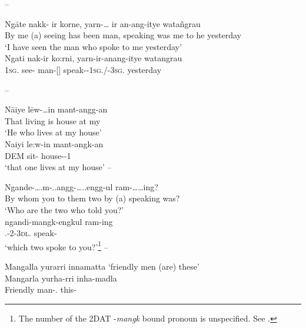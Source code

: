 \documentclass{langscibook}
\begin{document}
\begin{xlist}
\begin{xlist}
\end{xlist}
\z
--
\ea\label{ex:key:44} %
\begin{xlist}
	\ex
	\gll Ngāte {} nakk- ir korne, yarn-… ir an-ang-itye watañgrau \\
	{By me} (a) seeing {has been} man, speaking was {me to he} yesterday \\
	\glt `I have seen the man who spoke to me yesterday' \\
	\citep[33]{meyer_vocabulary_1843}
	\ex
	\gll Ngati nak-ir ko:rni, yarn-ir-anang-itye watangrau \\
	1\textsc{sg}. see- man-[]   speak--1\textsc{sg}./-3\textsc{sg}.       yesterday \\
\end{xlist}
\z
--
\ea\label{ex:key:45}
\begin{xlist}
	\ex
	\gll Nāiye lēw-…in mant-angg-an \\
	That {living  is} {house at my} \\
	\glt `He who lives at my house' \\
	\citep[32]{meyer_vocabulary_1843}
	\ex
	\gll Naiyi le:w-in mant-angk-an \\
	DEM sit- house--1 \\
	\glt `that one lives at my house'
\z
\z
--
\ea\label{ex:key:46} %
\begin{xlist}
	\ex
	\gll  Ngande-….m-..angg-…..engg-ul {}  ram-……ing? \\
    {By whom you to them two}  {by (a)} {speaking was}? \\
	\glt `Who are the two who told you?' \\
	\citep[32]{meyer_vocabulary_1843}
	\ex
	\gll ngandi-mangk-engkul ram-ing \\
	.-2-3\textsc{dl}. speak-\\
	\glt `which two spoke to you?'\footnote{The number of the 2DAT -\textit{mangk} bound pronoun is unspecified. See .}
\z
\z
--
\ea %
\begin{xlist}
	\ex Mangalla yurarri innamatta
	\glt `friendly men (are) these' \\
	\citep[10]{Schürmann1844}
	\ex
	\gll Mangarla yurha-rri inha-madla  \\
	Friendly man-.     this-\\
\end{xlist}
\z


\end{xlist}
\end{xlist}
\end{xlist}
\end{document}
